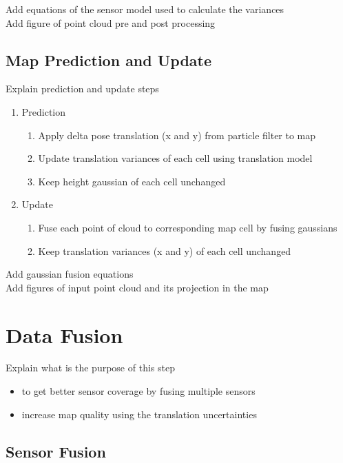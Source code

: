 \noindent
Add equations of the sensor model used to calculate the variances\\
Add figure of point cloud pre and post processing

\subsection{Map Prediction and Update}

Explain prediction and update steps

\begin{enumerate}
    \item Prediction
        \begin{enumerate}
            \item Apply delta pose translation (x and y) from particle filter to map
            \item Update translation variances of each cell using translation model
            \item Keep height gaussian of each cell unchanged
        \end{enumerate}
    \item Update
        \begin{enumerate}
            \item Fuse each point of cloud to corresponding map cell by fusing gaussians
            \item Keep translation variances (x and y) of each cell unchanged
        \end{enumerate}
\end{enumerate}

\noindent
Add gaussian fusion equations\\
Add figures of input point cloud and its projection in the map

\section{Data Fusion}

Explain what is the purpose of this step

\begin{itemize}
    \item to get better sensor coverage by fusing multiple sensors
    \item increase map quality using the translation uncertainties
\end{itemize}

\subsection{Sensor Fusion}

